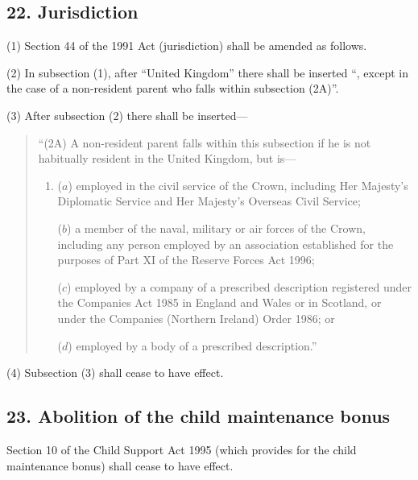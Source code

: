 \documentclass[12pt,a4paper]{article}
\begin{document}
\subsection{22. Jurisdiction}

(1) Section 44 of the 1991 Act (jurisdiction) shall be amended as follows.
 
(2) In subsection (1), after “United Kingdom” there shall be inserted “, except in the case of a non-resident parent who falls within subsection (2A)”.

(3) After subsection (2)  there shall be inserted—
\begin{quotation}
“(2A) A non-resident parent falls within this subsection if he is not habitually resident in the United Kingdom, but is—
\begin{enumerate}\item[]
($a$) employed in the civil service of the Crown, including Her Majesty’s Diplomatic Service and Her Majesty’s Overseas Civil Service;

($b$) a member of the naval, military or air forces of the Crown, including any person employed by an association established for the purposes of Part XI of the Reserve Forces Act 1996;

($c$) employed by a company of a prescribed description registered under the Companies Act 1985 in England and Wales or in Scotland, or under the Companies (Northern Ireland) Order 1986; or

($d$) employed by a body of a prescribed description.”
\end{enumerate}
\end{quotation}

(4) Subsection (3)  shall cease to have effect.


\subsection{23. Abolition of the child maintenance bonus}

Section 10 of the Child Support Act 1995 (which provides for the child maintenance bonus) shall cease to have effect.

\end{document}
